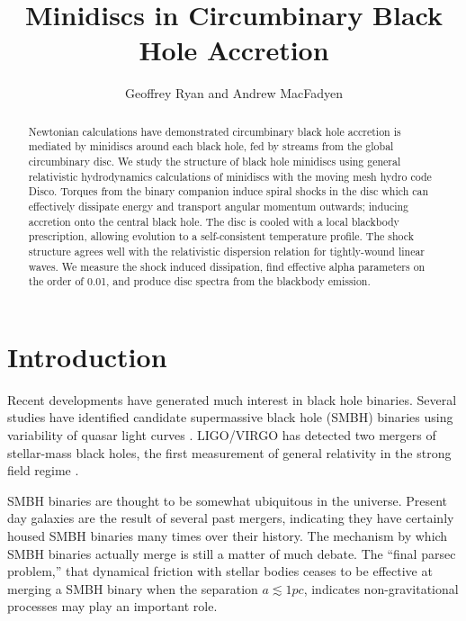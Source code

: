 \documentclass{emulateapj}
\begin{document}
\title{Minidiscs in Circumbinary Black Hole Accretion}
\author{Geoffrey Ryan and Andrew MacFadyen}

\begin{abstract}

Newtonian calculations have demonstrated circumbinary black hole accretion is mediated by minidiscs around each black hole, fed by streams from the global circumbinary disc. We study the structure of black hole minidiscs using general relativistic hydrodynamics calculations of minidiscs with the moving mesh hydro code Disco. Torques from the binary companion induce spiral shocks in the disc which can effectively dissipate energy and transport angular momentum outwards; inducing accretion onto the central black hole. The disc is cooled with a local blackbody prescription, allowing evolution to a self-consistent temperature profile.  The shock structure agrees well with the relativistic dispersion relation for tightly-wound linear waves. We measure the shock induced dissipation, find effective alpha parameters on the order of 0.01, and produce disc spectra from the blackbody emission.

\end{abstract}



\section{Introduction}
\label{sec:intro}

Recent developments have generated much interest in black hole binaries.  Several studies have identified candidate supermassive black hole (SMBH) binaries using variability of quasar light curves \citep{Graham15, Charisi16}.  LIGO/VIRGO has detected two mergers of stellar-mass black holes, the first measurement of general relativity in the strong field regime \citep{LIGO16GW150914Discoovery}.

SMBH binaries are thought to be somewhat ubiquitous in the universe.  Present day galaxies are the result of several past mergers, indicating they have certainly housed SMBH binaries many times over their history. The mechanism by which SMBH binaries actually merge is still a matter of much debate. The ``final parsec problem,'' that dynamical friction with stellar bodies ceases to be effective at merging a SMBH binary when the separation $a \lesssim 1pc$, indicates non-gravitational processes may play an important role.
\end{document}
